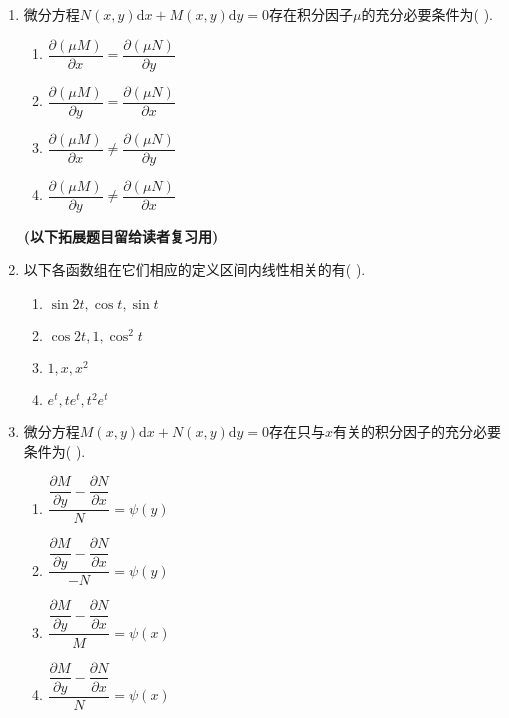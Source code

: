 \documentclass{ctexart}
\begin{document}
\begin{enumerate}
		\item 微分方程$N(x,y)\mathrm{d}x+M(x,y)\mathrm{d}y=0$存在积分因子$\mu$的充分必要条件为( ).
			\begin{enumerate}
				\item $\dfrac{\partial (\mu M)}{\partial x}=\dfrac{\partial (\mu N)}{\partial y}$
				\item $\dfrac{\partial (\mu M)}{\partial y}=\dfrac{\partial (\mu N)}{\partial x}$
				\item $\dfrac{\partial (\mu M)}{\partial x}\neq\dfrac{\partial (\mu N)}{\partial y}$
				\item $\dfrac{\partial (\mu M)}{\partial y}\neq\dfrac{\partial (\mu N)}{\partial x}$
			\end{enumerate}
		\vspace{1cm}
		\textbf{(以下拓展题目留给读者复习用)}
		\item 以下各函数组在它们相应的定义区间内线性相关的有( ).
			\begin{enumerate}
				\item $\sin 2t,\cos t,\sin t$
				\item $\cos 2t,1,\cos^2 t$
				\item $1,x,x^2$
				\item $e^t,te^t,t^2e^t$
			\end{enumerate}
		
		\item 微分方程$M(x,y)\mathrm{d}x+N(x,y)\mathrm{d}y=0$存在只与$x$有关的积分因子的充分必要条件为( ).
		\begin{enumerate}
			\item $\dfrac{\dfrac{\partial M}{\partial y}-\dfrac{\partial N}{\partial x}}{N}=\psi(y)$
			\item $\dfrac{\dfrac{\partial M}{\partial y}-\dfrac{\partial N}{\partial x}}{-N}=\psi(y)$
			\item $\dfrac{\dfrac{\partial M}{\partial y}-\dfrac{\partial N}{\partial x}}{M}=\psi(x)$
			\item $\dfrac{\dfrac{\partial M}{\partial y}-\dfrac{\partial N}{\partial x}}{N}=\psi(x)$
		\end{enumerate}
	\end{enumerate}
	
\end{document}

